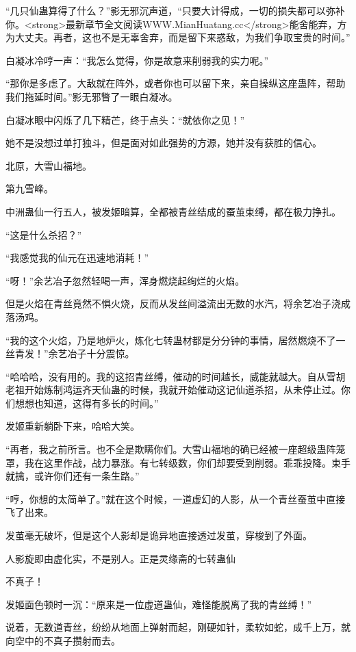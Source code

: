 
\begin{this_body}

“几只仙蛊算得了什么？”影无邪沉声道，“只要大计得成，一切的损失都可以弥补你。<strong>最新章节全文阅读WWW.MianHuatang.cc</strong>能舍能弃，方为大丈夫。再者，这也不是无辜舍弃，而是留下来惑敌，为我们争取宝贵的时间。”

白凝冰冷哼一声：“我怎么觉得，你是故意来削弱我的实力呢。”

“那你是多虑了。大敌就在阵外，或者你也可以留下来，亲自操纵这座蛊阵，帮助我们拖延时间。”影无邪瞥了一眼白凝冰。

白凝冰眼中闪烁了几下精芒，终于点头：“就依你之见！”

她不是没想过单打独斗，但是面对如此强势的方源，她并没有获胜的信心。

北原，大雪山福地。

第九雪峰。

中洲蛊仙一行五人，被发姬暗算，全都被青丝结成的蚕茧束缚，都在极力挣扎。

“这是什么杀招？”

“我感觉我的仙元在迅速地消耗！”

“呀！”余艺冶子忽然轻喝一声，浑身燃烧起绚烂的火焰。

但是火焰在青丝竟然不惧火烧，反而从发丝间溢流出无数的水汽，将余艺冶子浇成落汤鸡。

“我的这个火焰，乃是地炉火，炼化七转蛊材都是分分钟的事情，居然燃烧不了一丝青发！”余艺冶子十分震惊。

“哈哈哈，没有用的。我的这招青丝缚，催动的时间越长，威能就越大。自从雪胡老祖开始炼制鸿运齐天仙蛊的时候，我就开始催动这记仙道杀招，从未停止过。你们想想也知道，这得有多长的时间。”

发姬重新躺卧下来，哈哈大笑。

“再者，我之前所言。也不全是欺瞒你们。大雪山福地的确已经被一座超级蛊阵笼罩，我在这里作战，战力暴涨。有七转级数，你们却要受到削弱。乖乖投降。束手就擒，或许你们还有一条生路。”

“哼，你想的太简单了。”就在这个时候，一道虚幻的人影，从一个青丝蚕茧中直接飞了出来。

发茧毫无破坏，但是这个人影却是诡异地直接透过发茧，穿梭到了外面。

人影旋即由虚化实，不是别人。正是灵缘斋的七转蛊仙

不真子！

发姬面色顿时一沉：“原来是一位虚道蛊仙，难怪能脱离了我的青丝缚！”

说着，无数道青丝，纷纷从地面上弹射而起，刚硬如针，柔软如蛇，成千上万，就向空中的不真子攒射而去。


\end{this_body}
